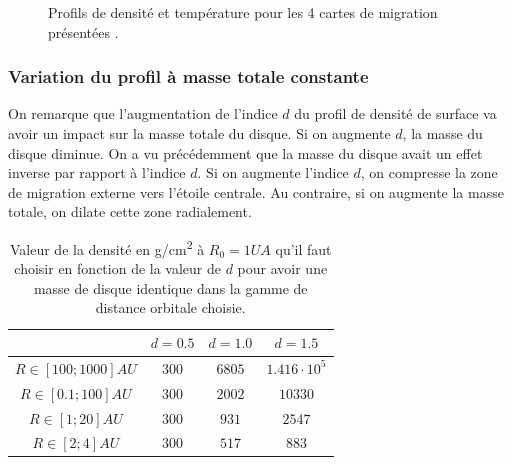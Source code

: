 \begin{figure}[htb]
\centering
{}\hfill
{}

\caption{Profils de densité et température pour les 4 cartes de migration présentées \protect{}.}\label{fig:index_profiles}
\end{figure}

\subsubsection{Variation du profil à masse totale constante}
On remarque que l'augmentation de l'indice $d$ du profil de densité de surface va avoir un impact sur la masse totale du
disque. Si on augmente $d$, la masse du disque diminue. On a vu précédemment que la masse du disque avait un effet inverse par rapport à l'indice $d$. Si on augmente
l'indice $d$, on compresse la zone de migration externe vers l'étoile centrale. Au contraire, si on augmente la masse totale, on
dilate cette zone radialement. 

\begin{table}[htb]
\centering
\begin{tabular}{|c|c|c|c|}
\hline 
 & $d=0.5$ & $d=1.0$ & $d=1.5$ \\\hline 
$R\in[100 ; 1000]\unit{AU}$ & $300$ & $6805$ & $1.416\cdot 10^5$ \\ \hline 
$R\in[0.1 ; 100]\unit{AU}$ & $300$ & $2002$ & $10330$ \\ \hline 
$R\in[1 ; 20]\unit{AU}$ & $300$ & $931$ & $2547$ \\ \hline 
$R\in[2 ; 4]\unit{AU}$ & $300$ & $517$ & $883$ \\ \hline 
\end{tabular} 
\caption{Valeur de la densité en \unit{g/cm^2} à $R_0=1\unit{UA}$ qu'il faut choisir en fonction de la valeur de $d$ pour avoir une masse de disque identique dans la gamme de distance orbitale choisie.}\label{tab:profils_equivalents}
\end{table}

